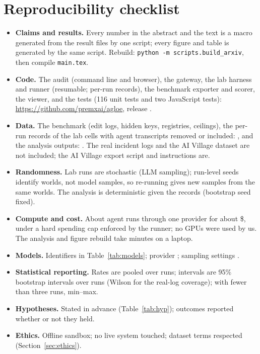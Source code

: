 \section{Reproducibility checklist}\label{app:checklist}

\begin{itemize}[leftmargin=1.4em]
  \item \textbf{Claims and results.} Every number in the abstract and the text is a macro generated from the result files by one script; every figure and table is generated by the same script. Rebuild: \texttt{python -m scripts.build\_arxiv}, then compile \texttt{main.tex}.
  \item \textbf{Code.} The audit (command line and browser), the gateway, the lab harness and runner (resumable; per-run records), the benchmark exporter and scorer, the viewer, and the tests (116 unit tests and two JavaScript tests): \url{https://github.com/premxai/agloe}, release .
  \item \textbf{Data.} The benchmark (edit logs, hidden keys, registries, ceilings), the per-run records of the \nCells{} lab cells with agent transcripts removed or included: , and the analysis outputs: . The real incident logs and the AI Village dataset are not included; the AI Village export script and instructions are.
  \item \textbf{Randomness.} Lab runs are stochastic (LLM sampling); run-level seeds identify worlds, not model samples, so re-running gives new samples from the same worlds. The analysis is deterministic given the records (bootstrap seed fixed).
  \item \textbf{Compute and cost.} About \nRuns{} agent runs through one provider for about \$\labUSD{}, under a hard spending cap enforced by the runner; no GPUs were used by us. The analysis and figure rebuild take minutes on a laptop.
  \item \textbf{Models.} Identifiers in Table~\ref{tab:models}; provider ; sampling settings .
  \item \textbf{Statistical reporting.} Rates are pooled over runs; intervals are 95\% bootstrap intervals over runs (Wilson for the real-log coverage); with fewer than three runs, min--max.
  \item \textbf{Hypotheses.} Stated in advance (Table~\ref{tab:hyp}); outcomes reported whether or not they held.
  \item \textbf{Ethics.} Offline sandbox; no live system touched; dataset terms respected (Section~\ref{sec:ethics}).
\end{itemize}
